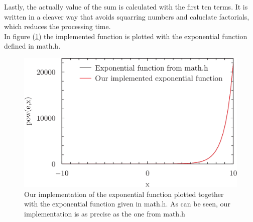 \documentclass{article}
\begin{document}
Lastly, the actually value of the sum is calculated with the first ten terms. It is written in a cleaver way that avoids squarring numbers and caluclate factorials, which reduces the processing time.\\
In figure (\ref{fig:ex}) the implemented function is plotted with the exponential function defined in math.h.
\begin{figure}[h]
\centering
\includegraphics[width=0.8\linewidth]{ex.png}
\caption{Our implementation of the exponential function plotted together with the exponential function given in math.h. As can be seen, our implementation is as precise as the one from math.h}
\label{fig:ex}
\end{figure}
\end{document}
